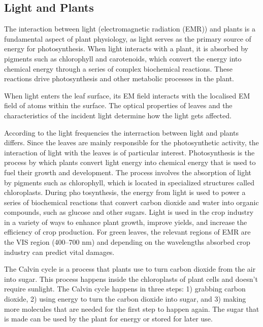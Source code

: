 \documentclass{article}
\begin{document}
{            \subsection{Light and Plants}
            \hspace{0.5cm}The interaction between light (electromagnetic radiation (EMR)) and plants is a fundamental aspect of plant physiology, as light serves as the primary source of energy for photosynthesis. When light interacts with a plant, it is absorbed by pigments such as chlorophyll and carotenoids, which convert the energy into chemical energy through a series of complex biochemical reactions. These reactions drive photosynthesis and other metabolic processes in the plant.\par
            When light enters the leaf surface, its EM field interacts with the localised EM field of atoms within the surface. The optical properties of leaves and the characteristics of the incident light determine how the light gets affected.\par
            According to the light frequencies the interraction between light and plants differs. Since the leaves are mainly responsible for the photosynthetic activity, the interaction of light with the leaves is of particular interest. Photosynthesis is the process by which plants convert light energy into chemical energy that is used to fuel their growth and development. The process involves the absorption of light by pigments such as chlorophyll, which is located in specialized structures called chloroplasts. During photosynthesis, the energy from light is used to power a series of biochemical reactions that convert carbon dioxide and water into organic compounds, such as glucose and other sugars. Light is used in the crop industry in a variety of ways to enhance plant growth, improve yields, and increase the efficiency of crop production. For green leaves, the relevant regions of EMR are the VIS region (400–700 nm) and depending on the wavelengths absorbed crop industry can predict vital damages.\par
            
            The Calvin cycle is a process that plants use to turn carbon dioxide from the air into sugar. This process happens inside the chloroplasts of plant cells and doesn’t require sunlight. The Calvin cycle happens in three steps: 1) grabbing carbon dioxide, 2) using energy to turn the carbon dioxide into sugar, and 3) making more molecules that are needed for the first step to happen again. The sugar that is made can be used by the plant for energy or stored for later use.\cite{B. Buchanan}\cite{Devlin, P.F.}\par
            \vspace*{2\baselineskip}
            
}
\end{document}
